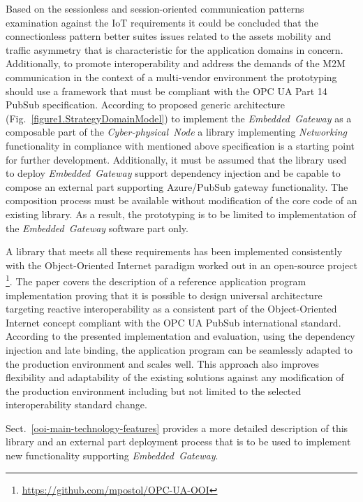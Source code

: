 \documentclass{article}
\begin{document}
Based on the sessionless and session-oriented communication patterns examination against the IoT requirements \cite{mpostol2020} it could be concluded that the connectionless pattern better suites issues related to the assets mobility and traffic asymmetry that is characteristic for the application domains in concern. Additionally, to promote interoperability and address the demands of the M2M communication in the context of a multi-vendor environment the prototyping should use a framework that must be compliant with the OPC UA Part 14 PubSub \cite{RefWorks:doc:5d98837de4b055984c0eecf0} specification. According to proposed generic architecture (Fig.~\ref*{figure1.StrategyDomainModel}) to implement the \textit{Embedded\ Gateway} as a composable part of the \textit{Cyber-physical\ Node} a library implementing \textit{Networking} functionality in compliance with mentioned above specification is a starting point for further development. Additionally, it must be assumed that the library used to deploy \textit{Embedded\ Gateway} support dependency injection and be capable to compose an external part supporting Azure/PubSub gateway functionality. The composition process must be available without modification of the core code of an existing library. As a result, the prototyping is to be limited to implementation of the \textit{Embedded\ Gateway} software part only.

A library that meets all these requirements has been implemented consistently with the Object-Oriented Internet paradigm \cite{RefWorks:doc:5c66740ae4b081adf5804596} worked out in an open-source project \footnote{ \url{https://github.com/mpostol/OPC-UA-OOI} }. The paper \cite{mpostol2020} covers the description of a reference application program implementation proving that it is possible to design universal architecture targeting reactive interoperability as a consistent part of the Object-Oriented Internet concept compliant with the OPC UA PubSub \cite{RefWorks:doc:5d98837de4b055984c0eecf0} international standard. According to the presented implementation and evaluation, using the dependency injection and late binding, the application program can be seamlessly adapted to the production environment and scales well. This approach also improves flexibility and adaptability of the existing solutions against any modification of the production environment including but not limited to the selected interoperability standard change.

Sect.~\ref*{ooi-main-technology-features} provides a more detailed description of this library and an external part deployment process that is to be used to implement new functionality supporting \textit{Embedded\ Gateway}.
\end{document}
